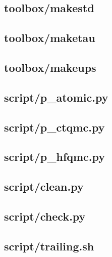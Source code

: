 \subsection{toolbox/makestd}
\subsection{toolbox/maketau}
\subsection{toolbox/makeups}
\subsection{script/p\_atomic.py}
\subsection{script/p\_ctqmc.py}
\subsection{script/p\_hfqmc.py}
\subsection{script/clean.py}
\subsection{script/check.py}
\subsection{script/trailing.sh}
